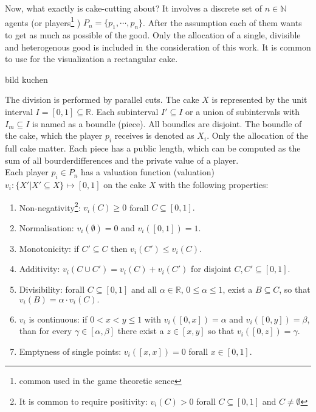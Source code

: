 Now, what exactly is cake-cutting about? It involves a discrete set of $n \in \mathbb{N}$ agents (or players\footnote{common used in the game theoretic sence} ) $P_n=\{p_1,\cdots,p_n\}$. After the assumption each of them wants to get as much as possible of the good. Only the allocation of a single, divisible and heterogenous good is included in the consideration of this work. It is common to use for the visualization a rectangular cake.
\begin{center}
bild kuchen
\end{center}
The division is performed by parallel cuts. The cake $X$ is represented by the unit interval $I=[0,1] \subseteq \mathbb{R}$. Each subinterval $I'\subseteq I$ or a union of subintervals %
with $I_m\subseteq I$ is named as a boundle (piece). All boundles are disjoint. The boundle of the cake, which the player $p_i$ receives is denoted as $X_i$. Only the allocation of the full cake matter. Each piece has a public length, which can be computed as the sum of all bourderdifferences and the private value of a player.\\

Each player $p_i\in P_n$ has a valuation function (valuation) $v_i:\{X'|X' \subseteq X\} \mapsto [0,1]$ on the cake $X$ with the following properties:\\
\begin{enumerate}
\item Non-negativity\footnote{It is common to require positivity: $v_i(C)>0$ forall $C\subseteq [0,1]$ and $C \neq \emptyset$}: $v_i(C)\geq 0$ forall $C\subseteq [0,1].$
\item Normalisation: $v_i(\emptyset)=0$ and $v_i([0,1])=1.$
\item Monotonicity: if $C' \subseteq C$ then $v_i(C') \leq v_i(C).$
\item Additivity: $v_i(C \cup C')=v_i(C)+v_i(C')$ for disjoint
$C,C'\subseteq [0,1].$
\item Divisibility: forall $C\subseteq [0,1]$ and all $\alpha \in
\mathbb{R}$, $0\leq \alpha \leq 1$, exist a $B\subseteq C$, so that
$v_i(B)=\alpha \cdot v_i(C).$
\item  $v_i$ is continuous: if $0<x<y\leq 1$ with $v_i([0,x])=\alpha$ and
$v_i([0,y])=\beta$, than for every $\gamma \in [\alpha,\beta]$ there exist a $z \in [x,y]$ so that $v_i([0,z])=\gamma.$
\item Emptyness of single points:  $v_i([x,x])=0$ forall $x\in [0,1].$
\end{enumerate}

